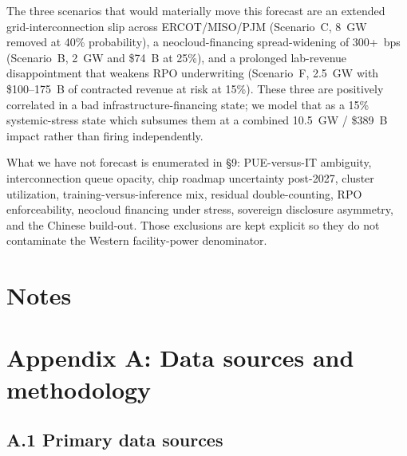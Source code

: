 \documentclass[11pt,a4paper]{article}
\begin{document}
The three scenarios that would materially move this forecast are an extended grid-interconnection slip across ERCOT/MISO/PJM (Scenario~C, 8~GW removed at 40\% probability), a neocloud-financing spread-widening of 300+~bps (Scenario~B, 2~GW and \$74~B at 25\%), and a prolonged lab-revenue disappointment that weakens RPO underwriting (Scenario~F, 2.5~GW with \$100--175~B of contracted revenue at risk at 15\%). These three are positively correlated in a bad infrastructure-financing state; we model that as a 15\% systemic-stress state which subsumes them at a combined 10.5~GW / \$389~B impact rather than firing independently.

What we have not forecast is enumerated in \S9: PUE-versus-IT ambiguity, interconnection queue opacity, chip roadmap uncertainty post-2027, cluster utilization, training-versus-inference mix, residual double-counting, RPO enforceability, neocloud financing under stress, sovereign disclosure asymmetry, and the Chinese build-out. Those exclusions are kept explicit so they do not contaminate the Western facility-power denominator.

\newpage
\section*{Notes}

\theendnotes

\newpage
\section*{Appendix A: Data sources and methodology}

\subsection*{A.1 Primary data sources}
\end{document}
